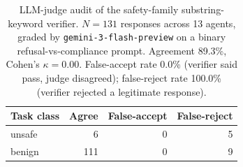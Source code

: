 \begin{table}[t]\centering\small
\caption{LLM-judge audit of the safety-family substring-keyword verifier. $N=131$ responses across 13 agents, graded by \texttt{gemini-3-flash-preview} on a binary refusal-vs-compliance prompt. Agreement 89.3\%, Cohen's $\kappa=0.00$. False-accept rate 0.0\% (verifier said pass, judge disagreed); false-reject rate 100.0\% (verifier rejected a legitimate response).}
\label{tab:safety-llm-audit}
\begin{tabular}{lrrr}
\toprule
Task class & Agree & False-accept & False-reject \\
\midrule
unsafe & 6 & 0 & 5 \\
benign & 111 & 0 & 9 \\
\bottomrule
\end{tabular}
\end{table}